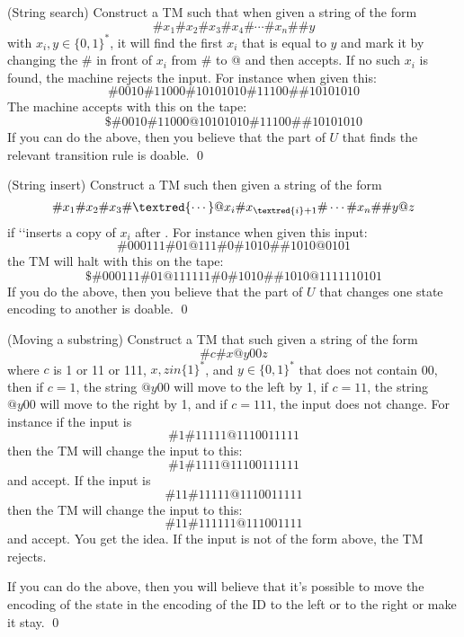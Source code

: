 \newpage
\begin{ex} (String search)
  Construct a TM such that when given a string of the form
  \[
  \# x_1 \# x_2 \# x_3 \# x_4 \# \cdots \# x_n \#\# y
  \]
  with $x_i, y \in \{0, 1\}^*$, it will find the first $x_i$
  that is equal to $y$ and mark it by changing the \# in front of
  $x_i$ from \# to @ and then accepts.
  If no such $x_i$ is found, the machine rejects the input.
  For instance when given this:
  \[
  \# 0010 \# 11000 \# 10101010 \# 11100  \#\# 10101010
  \]
  The machine accepts with this on the tape:
  \[
  \$\# 0010 \# 11000 @ 10101010 \# 11100  \#\# 10101010
  \]
  If you can do the above, then you believe that the part
  of $U$ that finds the relevant transition rule is doable.
  \qed
\end{ex}

\newpage
\begin{ex} (String insert)
  Construct a TM such then given a string of the form
  \[
  \# x_1 \# x_2 \# x_3 \# \textred{\cdots} @ x_i \# x_{\textred{i}+1} \# \cdots \# x_n \#\# y@z
  \]
  if \lq\lq inserts a copy of $x_i$ after .
  For instance when given this input:
  \[
  \# 000111 \# 01 @ 111 \# 0 \# 1010 \#\# 1010@0101
  \]
  the TM will halt with this on the tape:
  \[
  \$\# 000111 \# 01 @ 111111 \# 0 \# 1010 \#\# 1010@1111110101
  \]
  If you do the above, then you believe that the part of $U$
  that changes one state encoding to another is doable.
  \qed
\end{ex}


\newpage
\begin{ex} (Moving a substring)
  Construct a TM that such given a string of the form
  \[
  \# c \# x @y00 z 
  \]
  where $c$ is 1 or 11 or 111, $x,z in \{1\}^*$, and $y \in \{0, 1\}^*$
  that does not contain 00,
  then if $c = 1$, the string $@y00$ will move to the left by 1,
  if $c = 11$, the string $@y00$ will move to the right by 1,
  and if $c = 111$, the input does not change.
  For instance if the input is
  \[
  \# 1 \# 11111 @11100 11111 
  \]
  then the TM will change the input to this:
  \[
  \# 1 \# 1111 @11100 111111 
  \]
  and accept.
  If the input is
  \[
  \# 11 \# 11111 @11100 11111 
  \]
  then the TM will change the input to this:
  \[
  \# 11 \# 111111 @11100 1111 
  \]
  and accept.
  You get the idea.
  If the input is not of the form above, the TM rejects.
  
  If you can do the above, then you will believe that it's possible
  to move the encoding of the state in the encoding of the ID
  to the left or to the right or make it stay.
  \qed
\end{ex}
  
